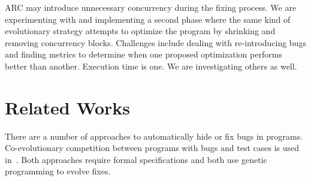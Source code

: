\documentclass{llncs}
\begin{document}
ARC may introduce unnecessary concurrency during the fixing process.
We are experimenting with and implementing a second phase where the
same kind of evolutionary strategy attempts to optimize the program by
shrinking and removing concurrency blocks.  Challenges include
dealing with re-introducing bugs and finding metrics to determine when
one proposed optimization performs better than another.  Execution time is
one.  We are investigating others as well.


\section{Related Works}
\label{sec:related_works}

There are a number of approaches to automatically hide or fix bugs in programs.
Co-evolutionary competition between programs with bugs and test cases is used
in~\cite{AY08, Arc08, WT10}. Both approaches require formal specifications and
both use genetic programming to evolve fixes.
\end{document}
